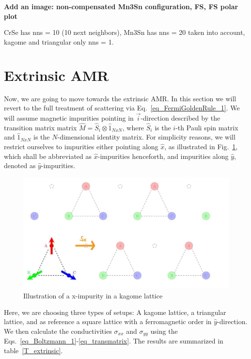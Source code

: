 \documentclass[prb,showpacs,amsmath,amssymb,superscriptaddress,twocolumn,floatfix]{revtex4-1}
\begin{document}
{\color{red} \textbf{Add an image: non-compensated Mn3Sn configuration, FS, FS polar plot}
}

{\color{red} CrSe has nns = 10 (10 next neighbors), Mn3Sn has nns = 20 taken into account, kagome and triangular only nns = 1. } 

\section{Extrinsic AMR}
\label{sec_extrinsic}

Now, we are going to move towards the extrinsic AMR. In this section we will revert to the full treatment of scattering via Eq.~\ref{eq_FermiGoldenRule_1}. We will assume magnetic impurities pointing in $\vec{i}$-direction described by the transition matrix matrix $\hat{M} = \hat{S}_i \otimes \hat{1}_{NxN}$, where $\hat{S}_i$ is the $i$-th Pauli spin matrix and $\hat{1}_{NxN}$ is the $N$-dimensional identity matrix. For simplicity reasons, we will restrict ourselves to impurities either pointing along $\hat{x}$, as illustrated in Fig.~\ref{fig:kagome21}, which shall be abbreviated as $\hat{x}$-impurities henceforth, and impurities along $\hat{y}$, denoted as $\hat{y}$-impurities.

\begin{figure}
	\centering
	\includegraphics[width=0.8\linewidth]{img/Kagome_21}
	\caption{Illustration of a x-impurity in a kagome lattice}
	\label{fig:kagome21}
\end{figure}


Here, we are choosing three types of setups: A kagome lattice, a triangular lattice, and as reference a square lattice with a ferromagnetic order in $\hat{y}$-direction. We then calculate the conductivities $\sigma_{xx}$ and $\sigma_{yy}$ using the Eqs.~\ref{eq_Boltzmann_1}-\ref{eq_transmatrix}. The results are summarized in table~\ref{T_extrinsic}.
\end{document}
